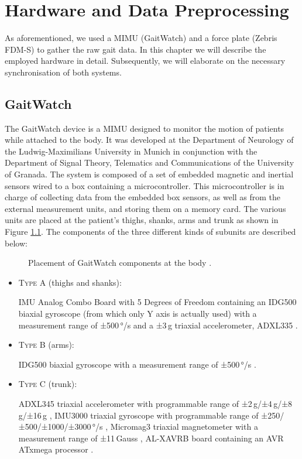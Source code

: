 \chapter{Hardware and Data Preprocessing}
\label{ch:Hardware}

As aforementioned, we used a MIMU (GaitWatch) and a force plate (Zebris FDM-S) to gather the raw gait data. In this chapter we will describe the employed hardware in detail. Subsequently, we will elaborate on the necessary synchronisation of both systems.

\section{GaitWatch}

The GaitWatch device \cite{olivares_vicente_gaitwatch_2013} is a MIMU designed to monitor the motion of patients while attached to the body. It was developed at the Department of Neurology of the Ludwig-Maximilians University in Munich in conjunction with the Department of Signal Theory, Telematics and Communications of the University of Granada. The system is composed of a set of embedded magnetic and inertial sensors wired to a box containing a microcontroller. This microcontroller is in charge of collecting data from the embedded box sensors, as well as from the external measurement units, and storing them on a memory card. The various units are placed at the patient's thighs, shanks, arms and trunk as shown in Figure \ref{fig:GaitWatch_placement}. The components of the three different kinds of subunits are described below:

\begin{figure}
	\centering
	\caption{Placement of GaitWatch components at the body \cite{olivares_vicente_gaitwatch_2013}.}
	\label{fig:GaitWatch_placement}
\end{figure}

\begin{itemize}

\item \textsc{Type A} (thighs and shanks): 

IMU Analog Combo Board with 5 Degrees of Freedom \cite{IMU5} containing an IDG500 biaxial gyroscope (from which only Y axis is actually used) with a measurement range of ±500\,°/s \cite{IDG500} and a ±3\,g triaxial accelerometer, ADXL335 \cite{ADXL335}.

\item \textsc{Type B} (arms):

IDG500 biaxial gyroscope with a measurement range of ±500\,°/s \cite{IDG500}.

\item \textsc{Type C} (trunk):

ADXL345 triaxial accelerometer with programmable range of ±2\,g/±4\,g/±8\,g/±16\,g \cite{ADXL345},
IMU3000 triaxial gyroscope with programmable range of ±250/±500/±1000/±3000\,°/s \cite{IMU3000}, 
Micromag3 triaxial magnetometer with a measurement range of ±11\,Gauss \cite{MicroMag3}, AL-XAVRB board containing an AVR ATxmega processor \cite{AVRATxmega}.

\end{itemize}


